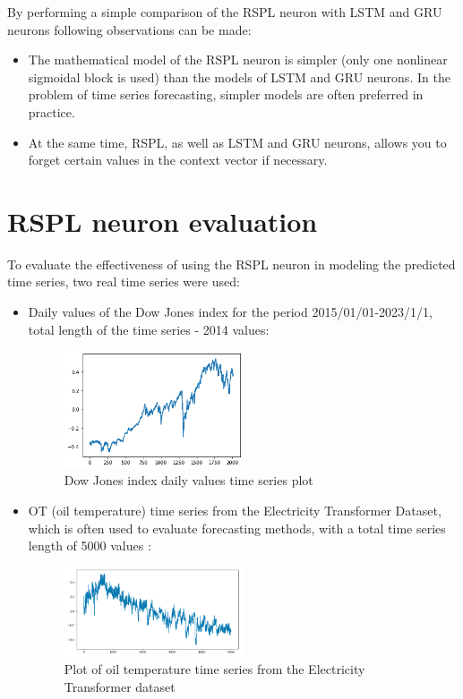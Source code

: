 \documentclass[sn-apa]{sn-jnl}%
\begin{document}
By performing a simple comparison of the RSPL neuron with LSTM and GRU neurons following observations can be made:

\begin{itemize}
\item The mathematical model of the RSPL neuron is simpler (only one nonlinear sigmoidal block is used) than the models of LSTM and GRU neurons. In the problem of time series forecasting, simpler models are often preferred in practice. 
\item At the same time, RSPL, as well as LSTM and GRU neurons, allows you to forget certain values in the context vector if necessary. 
\end{itemize}

\section{RSPL neuron evaluation}\label{sec6}
To evaluate the effectiveness of using the RSPL neuron in modeling the predicted time series, two real time series were used: 

\begin{itemize}
\item Daily values of the Dow Jones index for the period 2015/01/01-2023/1/1, total length of the time series - 2014 values:
\begin{figure}[H]
\centering
\includegraphics[width=0.5\textwidth]{dji_2015_01_01_2023_01_01.png}
\caption{Dow Jones index daily values time series plot}\label{fig8}
\end{figure}
\item OT (oil temperature) time series from the Electricity Transformer Dataset, which is often used to evaluate forecasting methods, with a total time series length of 5000 values \citep{haoyietal-informer-2021}:
\begin{figure}[H]
\centering
\includegraphics[width=0.5\textwidth]{etth_ot_time_series.png}
\caption{Plot of oil temperature time series from the Electricity Transformer dataset}\label{fig9}
\end{figure}
\end{itemize}
\end{document}
